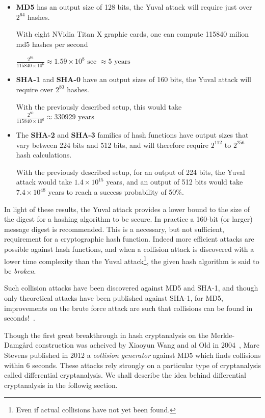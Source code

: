 \begin{itemize}
\item \textbf{MD5} has an output size of 128 bits, the Yuval attack will require just over $2^{64}$ hashes.
  
  With eight NVidia Titan X graphic cards, one can compute 115840 milion md5 hashes per second~\cite{hashcat}
  
 $\frac{2^{64}}{115840 \times 10^6} \approx 1.59 \times 10^8\mbox{ sec } \approx 5 \mbox{ years}$
  
\item \textbf{SHA-1} and \textbf{SHA-0} have an output sizes of 160 bits, the Yuval attack will require over $2^{80}$ hashes.
  
With the previously described setup, this would take $\frac{2^{80}}{115840 \times 10^6}  \approx 330929 \mbox{ years}$

\item The \textbf{SHA-2} and \textbf{SHA-3} families of hash functions have output sizes that vary between 224 bits and 512 bits, and will therefore require $2^{112}$ to $2^{256}$ hash calculations.

  With the previously described setup, for an output of 224 bits, the Yuval attack would take $1.4\times 10^{15}$ years, and an output of 512 bits would take $7.4 \times 10^{48}$ years to reach a success probability of 50\%. 
\end{itemize}

In light of these results, the Yuval attack provides a lower bound to the size of the digest for a hashing algorithm to be secure. In practice a 160-bit (or larger) message digest is recommended.
This is a necessary, but not sufficient, requirement for a cryptographic hash function. Indeed more efficient attacks are possible against hash functions, and when a collision attack is discovered with a lower time complexity than the Yuval attack\footnote{Even if actual collisions have not yet been found.}, the given hash algorithm is said to be \emph{broken}.

Such collision attacks have been discovered against MD5 and SHA-1, and though only theoretical attacks have been published against SHA-1, for MD5, improvements on the brute force attack are such that collisions can be found in seconds!~\cite{Att}.

Though the first great breakthrough in hash cryptanalysis on the Merkle-Damg\r{a}rd construction was acheived by Xiaoyun Wang and al Old in 2004~\cite{WA04}, Marc Stevens published in 2012 a \emph{collision generator} against MD5 which finds collisions within 6 seconds. These attacks rely strongly on a particular type of cryptanalysis called differential cryptanalysis. We shall describe the idea behind differential cryptanalysis in the followig section.


